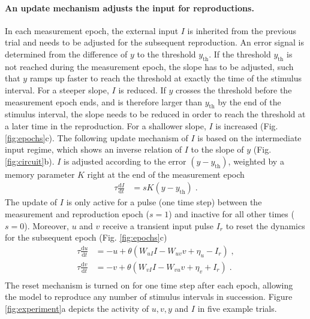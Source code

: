 \documentclass[10pt, a4paper]{article}
\begin{document}
\paragraph{An update mechanism adjusts the input for reproductions.}
In each measurement epoch, the external input $I$ is inherited from the previous trial and needs to be adjusted for the subsequent reproduction. 
An error signal is determined from the difference of $y$ to the threshold $y_{\text{th}}$.
If the threshold $y_{\text{th}}$ is not reached during the measurement epoch, the slope has to be adjusted, such that $y$ ramps up faster to reach the threshold at exactly the time of the stimulus interval. For a steeper slope, $I$ is reduced.
If $y$ crosses the threshold before the measurement epoch ends, and is therefore larger than $y_{\text{th}}$ by the end of the stimulus interval, the slope needs to be reduced in order to reach the threshold at a later time in the reproduction. For a shallower slope, $I$ is increased (Fig. \ref{fig:epochs}c).
The following update mechanism of $I$ is based on the intermediate input regime, which shows an inverse relation of $I$ to the slope of $y$ (Fig. \ref{fig:circuit}b).
$I$ is adjusted according to the error $(y-y_{\text{th}})$, weighted by a memory parameter $K$ right at the end of the measurement epoch
\begin{equation} \label{Iupdate}
	\begin{split}
	\tau\frac{\text{d}I}{\text{d}t} & = sK(y-y_{\text{th}}) \;.
	\end{split}
\end{equation}
The update of $I$ is only active for a pulse (one time step) between the measurement and reproduction epoch ($s=1$) and inactive for all other times ($s=0$).
Moreover, $u$ and $v$ receive a transient input pulse $I_r$ to reset the dynamics for the subsequent epoch (Fig. \ref{fig:epochs}c)
\begin{equation} \label{experimentcircuit}
	\begin{split}
	\tau\frac{\text{d}u}{\text{d}t} & = -u + \theta(W_{uI}I - W_{uv}v + \eta_u - I_r) \;,\\
	\tau\frac{\text{d}v}{\text{d}t} & = -v + \theta(W_{vI}I - W_{vu}v + \eta_v + I_r) \;.\\
	\end{split}
\end{equation}
The reset mechanism is turned on for one time step after each epoch, allowing the model to reproduce any number of stimulus intervals in succession.
Figure \ref{fig:experiment}a depicts the activity of $u, v, y$ and $I$ in five example trials. 
\end{document}
